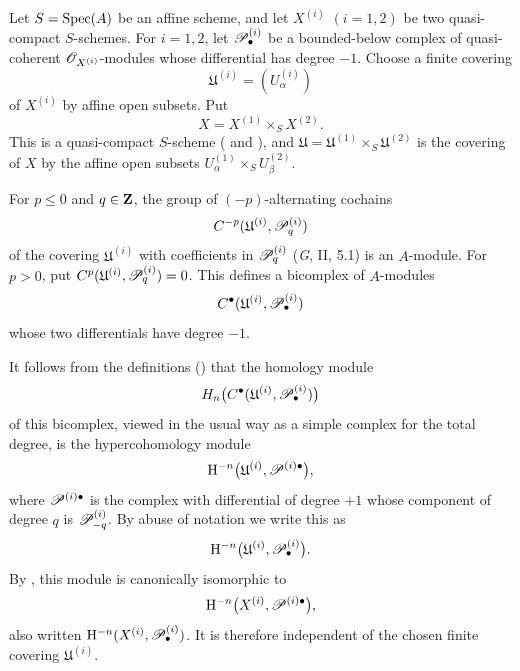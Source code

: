 \begin{env}[6.6.1]
\label{III.6.6.1}
Let $S=\operatorname{Spec}(A)$ be an affine scheme, and let $X^{(i)}$
$(i=1,2)$ be two quasi-compact $S$-schemes.  For $i=1,2$, let
$\mathscr{P}_\bullet^{(i)}$ be a bounded-below complex of
quasi-coherent $\mathscr{O}_{X^{(i)}}$-modules whose differential has
degree $-1$.  Choose a finite covering
\[
  \mathfrak U^{(i)}=(U_\alpha^{(i)})
\]
of $X^{(i)}$ by affine open subsets.  Put
\[
  X=X^{(1)}\times_SX^{(2)}.
\]
This is a quasi-compact $S$-scheme
( and ), and
$\mathfrak U=\mathfrak U^{(1)}\times_S\mathfrak U^{(2)}$ is the
covering of $X$ by the affine open subsets
$U_\alpha^{(1)}\times_SU_\beta^{(2)}$.

For $p\leq0$ and $q\in\mathbf{Z}$, the group of $(-p)$-alternating
cochains
\[
  C^{-p}(\mathfrak U^{(i)},\mathscr{P}_q^{(i)})
\]
of the covering $\mathfrak U^{(i)}$ with coefficients in
$\mathscr{P}_q^{(i)}$ (\emph{G}, II, 5.1) is an $A$-module.  For
$p>0$, put
$C^p(\mathfrak U^{(i)},\mathscr{P}_q^{(i)})=0$.  This defines a
bicomplex of $A$-modules
\[
  C^\bullet(\mathfrak U^{(i)},\mathscr{P}_\bullet^{(i)})
\]
whose two differentials have degree $-1$.

It follows from the definitions () that the
homology module
\[
  H_n\bigl(C^\bullet
    (\mathfrak U^{(i)},\mathscr{P}_\bullet^{(i)})\bigr)
\]
of this bicomplex, viewed in the usual way as a simple complex
for the total degree, is the hypercohomology module
\[
  \mathrm H^{-n}
  \bigl(\mathfrak U^{(i)},\mathscr{P}^{(i)\bullet}\bigr),
\]
where $\mathscr{P}^{(i)\bullet}$ is the complex with differential of
degree $+1$ whose component of degree $q$ is
$\mathscr{P}_{-q}^{(i)}$.  By abuse of notation we write this as
\[
  \mathrm H^{-n}
  \bigl(\mathfrak U^{(i)},\mathscr{P}_\bullet^{(i)}\bigr).
\]
By , this module is canonically isomorphic to
\[
  \mathrm H^{-n}\bigl(X^{(i)},\mathscr{P}^{(i)\bullet}\bigr),
\]
also written
$\mathrm H^{-n}(X^{(i)},\mathscr{P}_\bullet^{(i)})$.  It is therefore
independent of the chosen finite covering
$\mathfrak U^{(i)}$.
\end{env}

